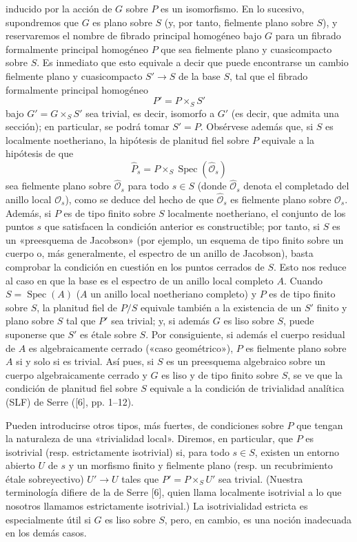 inducido por la acción de $G$ sobre $P$ es un isomorfismo. En lo sucesivo,
supondremos que $G$ es plano sobre $S$ (y, por tanto, fielmente plano sobre
$S$), y reservaremos el nombre de fibrado principal homogéneo bajo $G$ para un
fibrado formalmente principal homogéneo $P$ que sea fielmente plano y
cuasicompacto sobre $S$. Es inmediato que esto equivale a decir que puede
encontrarse un cambio fielmente plano y cuasicompacto
$S'\longrightarrow S$ de la base $S$, tal que el fibrado formalmente principal
homogéneo
\[
  P'=P\times_SS'
\]
bajo $G'=G\times_SS'$ sea trivial, es decir, isomorfo a $G'$ (es decir, que
admita una sección); en particular, se podrá tomar $S'=P$. Obsérvese además
que, si $S$ es localmente noetheriano, la hipótesis de planitud fiel sobre $P$
equivale a la hipótesis de que
\[
  \widehat P_s=P\times_S\operatorname{Spec}(\widehat{\mathcal O}_s)
\]
sea fielmente plano sobre $\widehat{\mathcal O}_s$ para todo $s\in S$ (donde
$\widehat{\mathcal O}_s$ denota el completado del anillo local
$\mathcal O_s$), como se deduce del hecho de que $\widehat{\mathcal O}_s$ es
fielmente plano sobre $\mathcal O_s$. Además, si $P$ es de tipo finito sobre
$S$ localmente noetheriano, el conjunto de los puntos $s$ que satisfacen la
condición anterior es constructible; por tanto, si $S$ es un «preesquema de
Jacobson» (por ejemplo, un esquema de tipo finito sobre un cuerpo o, más
generalmente, el espectro de un anillo de Jacobson), basta comprobar la
condición en cuestión en los puntos cerrados de $S$. Esto nos reduce al caso en
que la base es el espectro de un anillo local completo $A$. Cuando
$S=\operatorname{Spec}(A)$ ($A$ un anillo local noetheriano completo) y $P$ es
de tipo finito sobre $S$, la planitud fiel de $P/S$ equivale también a la
existencia de un $S'$ finito y plano sobre $S$ tal que $P'$ sea trivial; y, si
además $G$ es liso sobre $S$, puede suponerse que $S'$ es étale sobre $S$. Por
consiguiente, si además el cuerpo residual de $A$ es algebraicamente cerrado
(«caso geométrico»), $P$ es fielmente plano sobre $A$ si y solo si es trivial.
Así pues, si $S$ es un preesquema algebraico sobre un cuerpo algebraicamente
cerrado y $G$ es liso y de tipo finito sobre $S$, se ve que la condición de
planitud fiel sobre $S$ equivale a la condición de trivialidad analítica (SLF)
de Serre ([6], pp. 1--12).

Pueden introducirse otros tipos, más fuertes, de condiciones sobre $P$ que
tengan la naturaleza de una «trivialidad local». Diremos, en particular, que
$P$ es isotrivial (resp. estrictamente isotrivial) si, para todo $s\in S$,
existen un entorno abierto $U$ de $s$ y un morfismo finito y fielmente plano
(resp. un recubrimiento étale sobreyectivo) $U'\longrightarrow U$ tales que
$P'=P\times_SU'$ sea trivial. (Nuestra terminología difiere de la de Serre [6],
quien llama localmente isotrivial a lo que nosotros llamamos estrictamente
isotrivial.) La isotrivialidad estricta es especialmente útil si $G$ es liso
sobre $S$, pero, en cambio, es una noción inadecuada en los demás casos.

